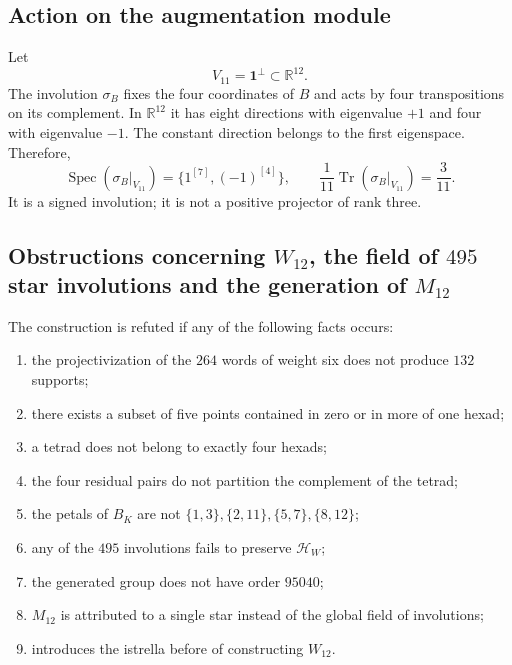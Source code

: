 \subsection{Action on the augmentation module}

Let
\[
 V_{11}=\mathbf1^\perp\subset\mathbb R^{12}.
\]
The involution \(\sigma_B\) fixes the four coordinates of \(B\) and acts by four transpositions on its complement. In \(\mathbb R^{12}\) it has eight directions with eigenvalue \(+1\) and four with eigenvalue \(-1\). The constant direction belongs to the first eigenspace. Therefore,
\begin{equation}
 \operatorname{Spec}(\sigma_B|_{V_{11}})
 =\{1^{[7]},(-1)^{[4]}\},
 \qquad
 \frac1{11}\operatorname{Tr}(\sigma_B|_{V_{11}})=\frac3{11}.
 \label{p12-83-c20-s2:eq:espectro-involucion-estrella-aumentacion}
\end{equation}
It is a signed involution; it is not a positive projector of rank three.

\subsection{Obstructions concerning \(W_{12}\), the field of \(495\) star involutions and the generation of \(M_{12}\)}

\begin{criterion}
The construction is refuted if any of the following facts occurs:
\begin{enumerate}
 \item the projectivization of the \(264\) words of weight six does not produce
       \(132\) supports;
 \item there exists a subset of five points contained in zero or in more of
       one hexad;
 \item a tetrad does not belong to exactly four hexads;
 \item the four residual pairs do not partition the complement of the
       tetrad;
 \item the petals of \(B_K\) are not
       \(\{1,3\},\{2,11\},\{5,7\},\{8,12\}\);
 \item any of the \(495\) involutions fails to preserve
       \(\mathcal H_W\);
 \item the generated group does not have order \(95040\);
 \item \(M_{12}\) is attributed to a single star instead of the global field of involutions;
 \item  introduces the istrella before of constructing \(W_{12}\).
\end{enumerate}
\end{criterion}



